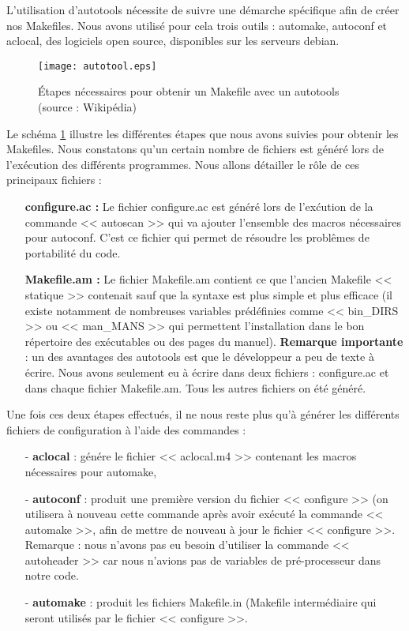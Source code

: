 L'utilisation d'autotools n\'ecessite de suivre une d\'emarche sp\'ecifique afin de cr\'eer nos Makefiles. Nous avons utilis\'e pour
cela trois outils : automake\citep{automake}, autoconf\citep{tuto_autotool} et aclocal, des logiciels open source, disponibles sur les serveurs debian.
\begin{figure}[h]
 \centerline{\texttt{[image: autotool.eps]}}
\caption{\'Etapes n\'ecessaires pour obtenir un Makefile avec un autotools (source : Wikip\'edia)} \label{fig:autotool}
\end{figure}
Le sch\'ema \ref{fig:autotool} illustre les diff\'erentes \'etapes que nous avons suivies pour obtenir les Makefiles.
Nous constatons qu'un certain nombre de fichiers est g\'en\'er\'e lors de l'ex\'ecution des diff\'erents programmes.
Nous allons d\'etailler le r\^ole de ces principaux fichiers :
\newline
\begin{itemize}
 \item [\textbullet] \textbf{ configure.ac :} Le fichier configure.ac est g\'en\'er\'e lors de l'ex\'cution de la commande << autoscan >>
qui va ajouter l'ensemble des macros n\'ecessaires pour autoconf. C'est ce fichier qui permet de r\'esoudre les probl\^emes de portabilit\'e du code.
\newline
 \item [\textbullet] \textbf{ Makefile.am :} Le fichier Makefile.am contient ce que l'ancien Makefile << statique >> contenait sauf que la syntaxe est 
plus simple et plus efficace (il existe notamment de nombreuses variables pr\'ed\'efinies comme << bin\_DIRS >> ou << man\_MANS >> qui permettent l'installation
dans le bon r\'epertoire des ex\'ecutables ou des pages du manuel).  
\newline
\newline
\textbf{Remarque importante} : un des avantages des autotools est que le d\'eveloppeur a peu de texte \`a \'ecrire. Nous avons seulement eu \`a \'ecrire dans
deux fichiers : configure.ac et dans chaque fichier Makefile.am. Tous les autres fichiers on \'et\'e g\'en\'er\'e.
\newline
\end{itemize}
Une fois ces deux \'etapes effectu\'es, il ne nous reste plus qu'\`a g\'en\'erer les diff\'erents fichiers de configuration \`a l'aide des commandes :
\begin{itemize}
 \item [-] \textbf{aclocal} : g\'en\'ere le fichier << aclocal.m4 >> contenant les macros n\'ecessaires pour automake,
 \item [-] \textbf{autoconf} : produit une premi\`ere version du fichier << configure >> (on utilisera \`a nouveau cette commande apr\`es avoir ex\'ecut\'e 
la commande << automake >>, afin de mettre de nouveau \`a jour le fichier << configure >>.
Remarque : nous n'avons pas eu besoin  d'utiliser la commande << autoheader >> car nous n'avions pas de variables de pr\'e-processeur dans notre code.
 \item [-] \textbf{automake} : produit les fichiers Makefile.in (Makefile interm\'ediaire qui seront utilis\'es par le fichier << configure >>.
\newline
\end{itemize}
